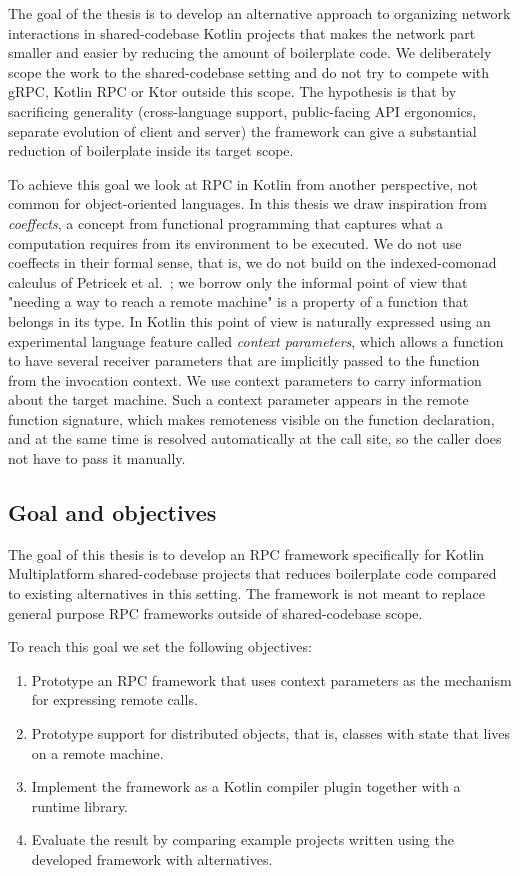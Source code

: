 \documentclass[a4paper,11pt,oneside]{article}
\newcommand{\term}[1]{\textit{#1}}
\begin{document}
The goal of the thesis is to develop an alternative approach to organizing network interactions in
shared-codebase Kotlin projects that makes the network part smaller and easier by reducing the amount
of boilerplate code. We deliberately scope the work to the shared-codebase setting and do not try to
compete with gRPC, Kotlin RPC or Ktor outside this scope. The hypothesis is that by sacrificing
generality (cross-language support, public-facing API ergonomics, separate evolution of client and
server) the framework can give a substantial reduction of boilerplate inside its target scope.

To achieve this goal we look at RPC in Kotlin from another perspective, not common for
object-oriented languages. In this thesis we draw inspiration from \term{coeffects}, a concept
from functional programming that captures what a computation requires from its
environment to be executed. We do not use coeffects in their formal sense, that is, we do not
build on the indexed-comonad calculus of Petricek et al.~\cite{petricek_coeffects_2013}; we
borrow only the informal point of view that "needing a way to reach a remote machine" is a
property of a function that belongs in its type. In Kotlin this point of view is naturally
expressed using an experimental language feature called \term{context parameters}, which allows
a function to have several receiver parameters that are implicitly passed to the function from
the invocation context. We use context parameters to carry information about the target machine.
Such a context parameter appears in the remote function signature, which makes remoteness
visible on the function declaration, and at the same time is resolved automatically at the call
site, so the caller does not have to pass it manually.

\subsection{Goal and objectives} \label{goal_and_objectives_section}

The goal of this thesis is to develop an RPC framework specifically for Kotlin Multiplatform
shared-codebase projects that reduces boilerplate code compared to existing alternatives in this
setting. The framework is not meant to replace general purpose RPC frameworks outside of
shared-codebase scope.

To reach this goal we set the following objectives:
\begin{enumerate}
  \item Prototype an RPC framework that uses context parameters as the mechanism for expressing
        remote calls.
  \item Prototype support for distributed objects, that is, classes with state that lives on a
        remote machine.
  \item Implement the framework as a Kotlin compiler plugin together with a runtime
        library.
  \item Evaluate the result by comparing example projects written using the developed framework with
        alternatives.
\end{enumerate}
\end{document}
